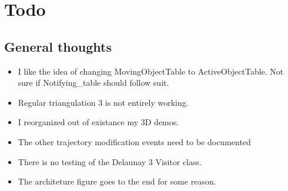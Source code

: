 \section{Todo}

\subsection{General thoughts}

\begin{itemize}

\item I like the idea of changing MovingObjectTable to ActiveObjectTable. Not sure if Notifying\_table should follow suit. 

\item Regular triangulation 3 is not entirely working.

\item I reorganized out of existance my 3D demos.

\item The other trajectory modification events need to be documented

\item There is no testing of the Delaunay 3 Visitor class. 

\item The architeture figure goes to the end for some reason. 

\end{itemize}

